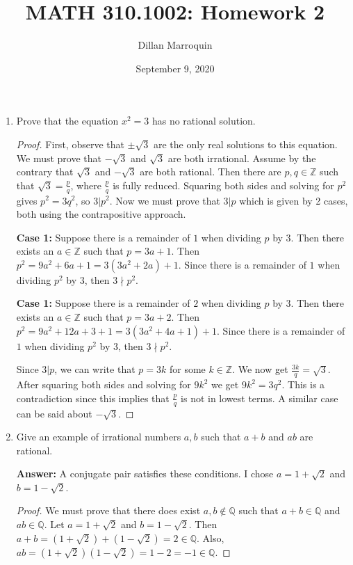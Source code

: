 \documentclass{article}
\title{MATH 310.1002: Homework 2}
\author{Dillan Marroquin}
\date{September 9, 2020}
\begin{document}
\maketitle


    \begin{enumerate}
        \item Prove that the equation $x^2 = 3$ has no rational solution.
            \begin{proof}
                First, observe that $\pm \sqrt{3}$ are the only real solutions to this equation. We must prove that $-\sqrt{3}$ and $\sqrt{3}$ are both irrational. Assume by the contrary that $\sqrt{3}$ and $-\sqrt{3}$ are both rational. Then there are $p,q \in \mathbb{Z}$ such that $\sqrt{3} = \frac{p}{q}$, where $\frac{p}{q}$ is fully reduced. Squaring both sides and solving for $p^2$ gives $p^2 = 3q^2$, so $3|p^2$. Now we must prove that $3|p$ which is given by 2 cases, both using the contrapositive approach.
                
                \textbf{Case 1:} Suppose there is a remainder of $1$ when dividing $p$ by $3$. Then there exists an $a \in \mathbb{Z}$ such that $p = 3a + 1 $. Then $p^2 = 9a^2 + 6a + 1 = 3(3a^2 + 2a) + 1$. Since there is a remainder of $1$ when dividing $p^2$ by $3$, then $3 \nmid p^2$.
                
                \textbf{Case 1:} Suppose there is a remainder of $2$ when dividing $p$ by $3$. Then there exists an $a \in \mathbb{Z}$ such that $p = 3a + 2 $. Then $p^2 = 9a^2 + 12a + 3 + 1 = 3(3a^2 + 4a + 1) + 1$. Since there is a remainder of $1$ when dividing $p^2$ by $3$, then $3 \nmid p^2$.
                
                Since $3|p$, we can write that $p = 3k$ for some $k \in \mathbb{Z}$. We now get $\frac{3k}{q} = \sqrt{3}$. After squaring both sides and solving for $9k^2$ we get $9k^2= 3q^2$. This is a contradiction since this implies that $\frac{p}{q}$ is not in lowest terms. A similar case can be said about $-\sqrt{3}$.
                
            \end{proof}

        \item Give an example of irrational numbers $a, b$ such that $a + b$ and $ab$ are rational.
        
            \textbf{Answer:} A conjugate pair satisfies these conditions. I chose $a = 1 + \sqrt{2}$ and $b = 1 - \sqrt{2}$.
            
            \begin{proof}
                We must prove that there does exist $a,b \notin \mathbb{Q}$ such that $a + b \in \mathbb{Q}$ and $ab \in \mathbb{Q}$. Let $a = 1 + \sqrt{2}$ and $b = 1 - \sqrt{2}$. Then $a + b = (1 + \sqrt{2}) + (1 - \sqrt{2}) = 2 \in \mathbb{Q}$. Also, $ab = (1 + \sqrt{2})(1 - \sqrt{2}) = 1 - 2 = -1 \in \mathbb{Q}$.
                

\end{proof}
\end{enumerate}
\end{document}

